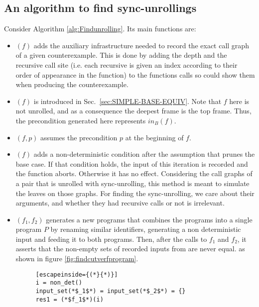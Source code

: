\subsection{An algorithm to find sync-unrollings} \label{sec:findsyncunrolling}
Consider Algorithm \ref{alg:Findunrolling}. Its main functions are: 
\begin{itemize}
    \item {}$(f)$ adds the auxiliary infrastructure needed to record the exact call graph of a given counterexample. This is done by adding the depth and the recursive call site (i.e. each recursive is given an index according to their order of appearance in the function) to the functions calls so  could show them when producing the counterexample.
    \item {}$(f)$ is introduced in Sec.~\ref{sec:SIMPLE-BASE-EQUIV}. Note that $f$ here is not unrolled, and as a consequence the deepest frame is the top frame. Thus, the precondition generated here represents $in_B(f)$. 
    \item {}$(f,p)$ assumes the precondition $p$ at the beginning of $f$. 
    \item {}$(f)$ adds a non-deterministic condition after the assumption that prunes the base case. If that condition holds, the input of this iteration is recorded and the function aborts. Otherwise it has no effect. Considering the call graphs of a pair that is unrolled with sync-unrolling, this method is meant to simulate the leaves on those graphs. For finding the sync-unrolling, we care about their arguments, and whether they had recursive calls or not is irrelevant.
    \item {}$(f_1,f_2)$ generates a new programs that combines the programs into a single program $P$ by renaming similar identifiers, generating a non deterministic input and feeding it to both programs. Then, after the calls to $f_1$ and $f_2$, it asserts that the non-empty sets of recorded inputs from  are never equal.
\iffalse    
    as shown in figure \ref{fig:findcutverfprogram}.
  \begin{figure} [h]
\begin{center}
\begin{minipage}{7 cm}
\begin{lstlisting}[escapeinside={(*}{*)}]
i = non_det()
input_set(*$_1$*) = input_set(*$_2$*) = {}
res1 = (*$f_1$*)(i)

\end{lstlisting}
\end{minipage}
\end{center}
\end{figure}
\end{itemize}
